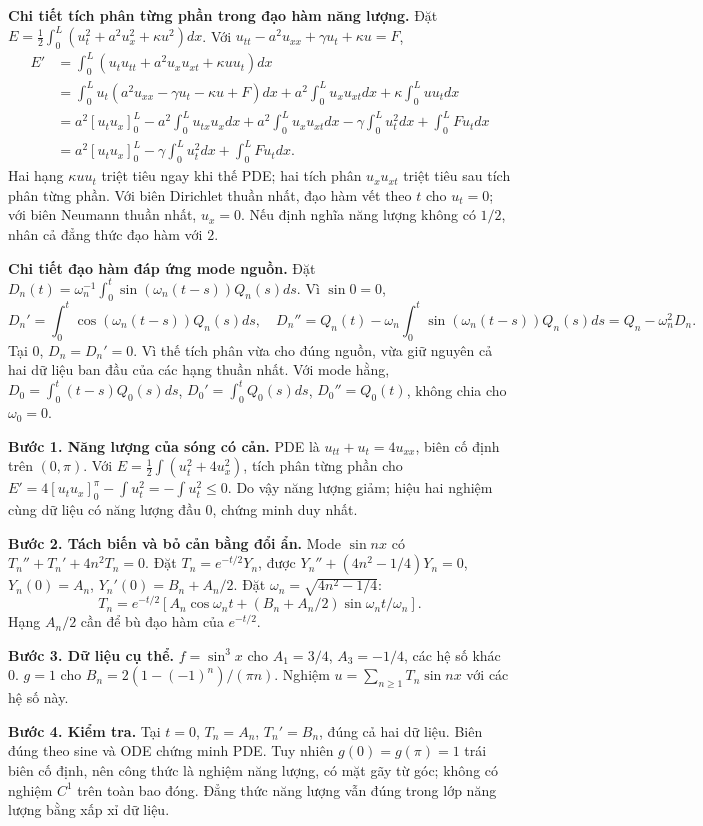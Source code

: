 \textbf{Chi tiết tích phân từng phần trong đạo hàm năng lượng.} Đặt $E=\frac12\int_0^L(u_t^2+a^2u_x^2+\kappa u^2)dx$. Với $u_{tt}-a^2u_{xx}+\gamma u_t+\kappa u=F$,
\[\begin{aligned}
E'&=\int_0^L(u_tu_{tt}+a^2u_xu_{xt}+\kappa uu_t)dx\\
&=\int_0^Lu_t(a^2u_{xx}-\gamma u_t-\kappa u+F)dx
+a^2\int_0^Lu_xu_{xt}dx+\kappa\int_0^Luu_tdx\\
&=a^2[u_tu_x]_0^L-a^2\int_0^Lu_{tx}u_xdx
+a^2\int_0^Lu_xu_{xt}dx-\gamma\int_0^Lu_t^2dx+\int_0^LFu_tdx\\
&=a^2[u_tu_x]_0^L-\gamma\int_0^Lu_t^2dx+\int_0^LFu_tdx.
\end{aligned}\]
Hai hạng $\kappa uu_t$ triệt tiêu ngay khi thế PDE; hai tích phân $u_xu_{xt}$ triệt tiêu sau tích phân từng phần. Với biên Dirichlet thuần nhất, đạo hàm vết theo $t$ cho $u_t=0$; với biên Neumann thuần nhất, $u_x=0$. Nếu định nghĩa năng lượng không có $1/2$, nhân cả đẳng thức đạo hàm với $2$.

\textbf{Chi tiết đạo hàm đáp ứng mode nguồn.} Đặt $D_n(t)=\omega_n^{-1}\int_0^t\sin(\omega_n(t-s))Q_n(s)ds$. Vì $\sin0=0$,
\[D_n'=\int_0^t\cos(\omega_n(t-s))Q_n(s)ds,\quad
D_n''=Q_n(t)-\omega_n\int_0^t\sin(\omega_n(t-s))Q_n(s)ds=Q_n-\omega_n^2D_n.\]
Tại $0$, $D_n=D_n'=0$. Vì thế tích phân vừa cho đúng nguồn, vừa giữ nguyên cả hai dữ liệu ban đầu của các hạng thuần nhất. Với mode hằng, $D_0=\int_0^t(t-s)Q_0(s)ds$, $D_0'=\int_0^tQ_0(s)ds$, $D_0''=Q_0(t)$, không chia cho $\omega_0=0$.

\textbf{Bước 1. Năng lượng của sóng có cản.} PDE là $u_{tt}+u_t=4u_{xx}$, biên cố định trên $(0,\pi)$. Với $E=\frac12\int(u_t^2+4u_x^2)$, tích phân từng phần cho $E'=4[u_tu_x]_0^\pi-\int u_t^2=-\int u_t^2\le0$. Do vậy năng lượng giảm; hiệu hai nghiệm cùng dữ liệu có năng lượng đầu $0$, chứng minh duy nhất.

\textbf{Bước 2. Tách biến và bỏ cản bằng đổi ẩn.} Mode $\sin nx$ có $T_n''+T_n'+4n^2T_n=0$. Đặt $T_n=e^{-t/2}Y_n$, được $Y_n''+(4n^2-1/4)Y_n=0$, $Y_n(0)=A_n$, $Y_n'(0)=B_n+A_n/2$. Đặt $\omega_n=\sqrt{4n^2-1/4}$:
\[T_n=e^{-t/2}[A_n\cos\omega_nt+(B_n+A_n/2)\sin\omega_nt/\omega_n].\]
Hạng $A_n/2$ cần để bù đạo hàm của $e^{-t/2}$.

\textbf{Bước 3. Dữ liệu cụ thể.} $f=\sin^3x$ cho $A_1=3/4$, $A_3=-1/4$, các hệ số khác $0$. $g=1$ cho $B_n=2(1-(-1)^n)/(\pi n)$. Nghiệm $u=\sum_{n\ge1}T_n\sin nx$ với các hệ số này.

\textbf{Bước 4. Kiểm tra.} Tại $t=0$, $T_n=A_n$, $T_n'=B_n$, đúng cả hai dữ liệu. Biên đúng theo sine và ODE chứng minh PDE. Tuy nhiên $g(0)=g(\pi)=1$ trái biên cố định, nên công thức là nghiệm năng lượng, có mặt gãy từ góc; không có nghiệm $C^1$ trên toàn bao đóng. Đẳng thức năng lượng vẫn đúng trong lớp năng lượng bằng xấp xỉ dữ liệu.

